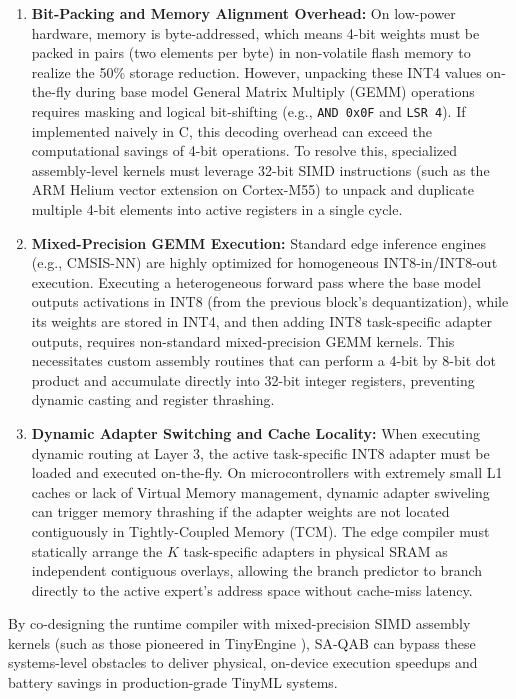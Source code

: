 \documentclass{article}
\theoremstyle{plain}
\theoremstyle{definition}
\theoremstyle{remark}
\begin{document}
\begin{enumerate}
    \item \textbf{Bit-Packing and Memory Alignment Overhead:} On low-power hardware, memory is byte-addressed, which means 4-bit weights must be packed in pairs (two elements per byte) in non-volatile flash memory to realize the 50\% storage reduction. However, unpacking these INT4 values on-the-fly during base model General Matrix Multiply (GEMM) operations requires masking and logical bit-shifting (e.g., \texttt{AND 0x0F} and \texttt{LSR 4}). If implemented naively in C, this decoding overhead can exceed the computational savings of 4-bit operations. To resolve this, specialized assembly-level kernels must leverage 32-bit SIMD instructions (such as the ARM Helium vector extension on Cortex-M55) to unpack and duplicate multiple 4-bit elements into active registers in a single cycle.
    \item \textbf{Mixed-Precision GEMM Execution:} Standard edge inference engines (e.g., CMSIS-NN) are highly optimized for homogeneous INT8-in/INT8-out execution. Executing a heterogeneous forward pass where the base model outputs activations in INT8 (from the previous block's dequantization), while its weights are stored in INT4, and then adding INT8 task-specific adapter outputs, requires non-standard mixed-precision GEMM kernels. This necessitates custom assembly routines that can perform a 4-bit by 8-bit dot product and accumulate directly into 32-bit integer registers, preventing dynamic casting and register thrashing.
    \item \textbf{Dynamic Adapter Switching and Cache Locality:} When executing dynamic routing at Layer 3, the active task-specific INT8 adapter must be loaded and executed on-the-fly. On microcontrollers with extremely small L1 caches or lack of Virtual Memory management, dynamic adapter swiveling can trigger memory thrashing if the adapter weights are not located contiguously in Tightly-Coupled Memory (TCM). The edge compiler must statically arrange the $K$ task-specific adapters in physical SRAM as independent contiguous overlays, allowing the branch predictor to branch directly to the active expert's address space without cache-miss latency.
\end{enumerate}
By co-designing the runtime compiler with mixed-precision SIMD assembly kernels (such as those pioneered in TinyEngine \cite{tinyengine}), SA-QAB can bypass these systems-level obstacles to deliver physical, on-device execution speedups and battery savings in production-grade TinyML systems.

\end{document}
